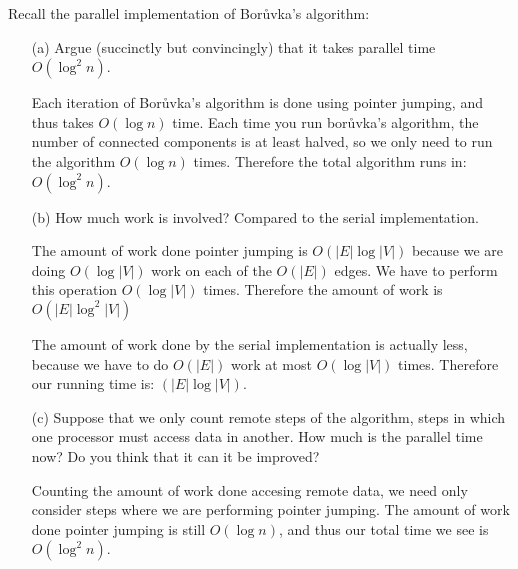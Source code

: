 \documentclass[11pt]{article}
\begin{document}
Recall the parallel implementation of Bor\r{u}vka's algorithm:
\begin{enumerate}
\item[(a)] Argue (succinctly but convincingly) that it takes parallel time
$O(\log^2 n)$.

Each iteration of Bor\r{u}vka's algorithm is done using pointer jumping, and
thus takes $O(\log n)$ time.  Each time you run bor\r{u}vka's algorithm, the
number of connected components is at least halved, so we only need to run the
algorithm $O(\log n)$ times. Therefore the total algorithm runs in: $O(\log^2
n)$.  \item[(b)] How much work is involved? Compared to the serial
implementation.

The amount of work done pointer jumping is $O(|E|\log |V|)$ because we are doing
$O(\log |V|)$ work on each of the $O(|E|)$ edges. We have to perform this
operation $O(\log |V|)$ times. Therefore the amount of work is $O(|E|\log^2
|V|)$

The amount of work done by the serial implementation is actually less, because
we have to do $O(|E|)$ work at most $O(\log |V|)$ times. Therefore our running
time is: $(|E|\log |V|)$.

\item[(c)] Suppose that we only count remote steps of the algorithm, steps in
which one processor must access data in another. How much is the parallel time
now? Do you think that it can it be improved?

Counting the amount of work done accesing remote data, we need only consider
steps where we are performing pointer jumping. The amount of work done pointer
jumping is still $O(\log n)$, and thus our total time we see is $O(\log^2 n)$.
\end{enumerate}
\newpage
\end{document}
